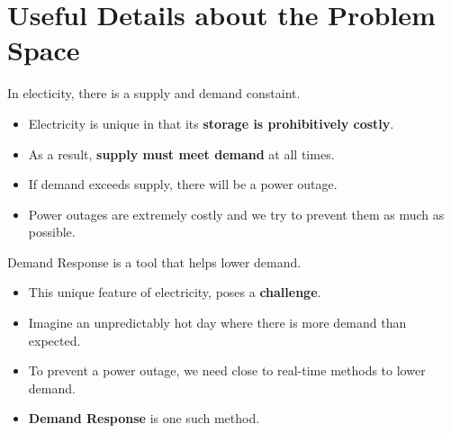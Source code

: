 \documentclass{beamer}
\begin{document}

\section{Useful Details about the Problem Space}

\begin{frame}{In electicity, there is a supply and demand constaint.}
  \begin{itemize}
    \item<+-> Electricity is unique in that its \textbf{storage is prohibitively costly}.
    \item<+-> As a result, \textbf{supply must meet demand} at all times. 
    \item<+-> If demand exceeds supply, there will be a power outage. 
    \item<+-> Power outages are extremely costly and we try to prevent them as much as possible.
  \end{itemize}
\end{frame}

\begin{frame}{Demand Response is a tool that helps lower demand.}
  \begin{itemize}
    \item<+-> This unique feature of electricity, poses a \textbf{challenge}. 
    \item<+-> Imagine an unpredictably hot day where there is more demand than expected.
    \item<+-> To prevent a power outage, we need close to real-time methods to lower demand.
    \item<+-> \textbf{Demand Response} is one such method.
  \end{itemize}
\end{frame}
\end{document}
